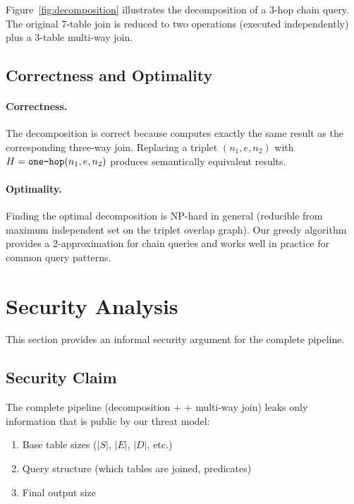 Figure~\ref{fig:decomposition} illustrates the decomposition of a 3-hop chain query. The original 7-table join is reduced to two \onehop operations (executed independently) plus a 3-table multi-way join.

\subsection{Correctness and Optimality}
\label{sec:decomposition:correctness}

\paragraph{Correctness.}
The decomposition is correct because \onehop computes exactly the same result as the corresponding three-way join. Replacing a triplet $(n_1, e, n_2)$ with $H = \texttt{one-hop}(n_1, e, n_2)$ produces semantically equivalent results.

\paragraph{Optimality.}
Finding the optimal decomposition is NP-hard in general (reducible from maximum independent set on the triplet overlap graph). Our greedy algorithm provides a 2-approximation for chain queries and works well in practice for common query patterns.


\section{Security Analysis}
\label{sec:security}

This section provides an informal security argument for the complete \system pipeline.

\subsection{Security Claim}
\label{sec:security:claim}

\begin{theorem}[Security]
The complete \system pipeline (decomposition + \onehop + multi-way join) leaks only information that is public by our threat model:
\begin{enumerate}
    \item Base table sizes ($|S|$, $|E|$, $|D|$, etc.)
    \item Query structure (which tables are joined, predicates)
    \item Final output size
\end{enumerate}
\end{theorem}

